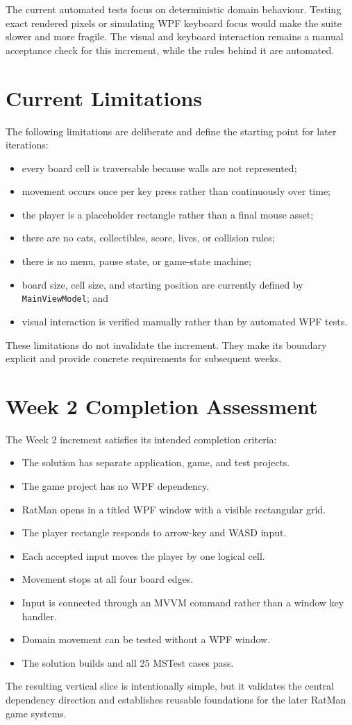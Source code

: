 The current automated tests focus on deterministic domain behaviour. Testing exact rendered pixels or simulating WPF keyboard focus would make the suite slower and more fragile. The visual and keyboard interaction remains a manual acceptance check for this increment, while the rules behind it are automated.

\section{Current Limitations}

The following limitations are deliberate and define the starting point for later iterations:

\begin{itemize}
	\item every board cell is traversable because walls are not represented;
	\item movement occurs once per key press rather than continuously over time;
	\item the player is a placeholder rectangle rather than a final mouse asset;
	\item there are no cats, collectibles, score, lives, or collision rules;
	\item there is no menu, pause state, or game-state machine;
	\item board size, cell size, and starting position are currently defined by \texttt{MainViewModel}; and
	\item visual interaction is verified manually rather than by automated WPF tests.
\end{itemize}

These limitations do not invalidate the increment. They make its boundary explicit and provide concrete requirements for subsequent weeks.

\section{Week 2 Completion Assessment}

The Week 2 increment satisfies its intended completion criteria:

\begin{itemize}
	\item The solution has separate application, game, and test projects.
	\item The game project has no WPF dependency.
	\item RatMan opens in a titled WPF window with a visible rectangular grid.
	\item The player rectangle responds to arrow-key and WASD input.
	\item Each accepted input moves the player by one logical cell.
	\item Movement stops at all four board edges.
	\item Input is connected through an MVVM command rather than a window key handler.
	\item Domain movement can be tested without a WPF window.
	\item The solution builds and all 25 MSTest cases pass.
\end{itemize}

The resulting vertical slice is intentionally simple, but it validates the central dependency direction and establishes reusable foundations for the later RatMan game systems.
